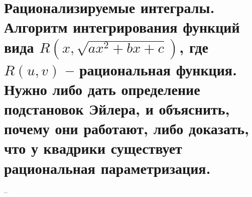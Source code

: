 \section{Рационализируемые интегралы. Алгоритм интегрирования функций вида $R(x, \sqrt{ax^2 + bx + c})$, где $R(u,v)$ -- рациональная функция. Нужно либо дать определение подстановок Эйлера, и объяснить, почему они работают, либо доказать, что у квадрики существует рациональная параметризация.}
--
\newline